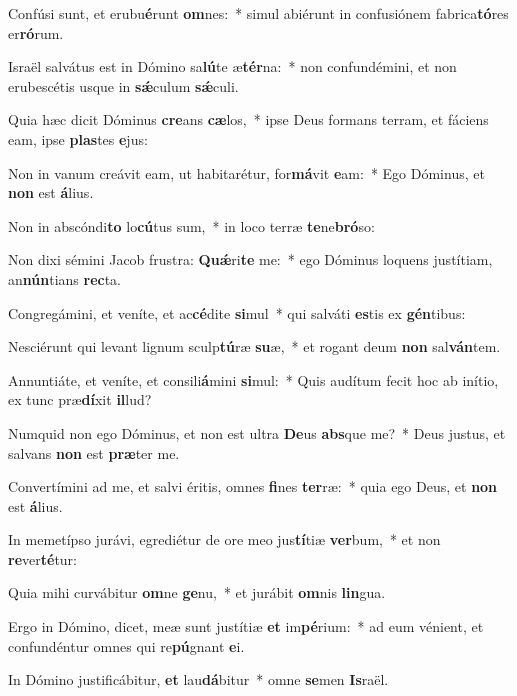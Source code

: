 \item Confúsi sunt, et erubu\textbf{é}runt \textbf{om}nes:~* simul abiérunt in confusiónem fabrica\textbf{tó}res er\textbf{ró}rum.
\item Israël salvátus est in Dómino sa\textbf{lú}te æ\textbf{tér}na:~* non confundémini, et non erubescétis usque in \textbf{sǽ}culum \textbf{sǽ}culi.
\item Quia hæc dicit Dóminus \textbf{cre}ans \textbf{cæ}los,~* ipse Deus formans terram, et fáciens eam, ipse \textbf{plas}tes \textbf{e}jus:
\item Non in vanum creávit eam, ut habitarétur, for\textbf{má}vit \textbf{e}am:~* Ego Dóminus, et \textbf{non} est \textbf{á}lius.
\item Non in abscóndi\textbf{to} lo\textbf{cú}tus sum,~* in loco terræ \textbf{te}ne\textbf{bró}so:
\item Non dixi sémini Jacob frustra: \textbf{Quǽ}ri\textbf{te} me:~* ego Dóminus loquens justítiam, an\textbf{nún}tians \textbf{rec}ta.
\item Congregámini, et veníte, et ac\textbf{cé}dite \textbf{si}mul~* qui salváti \textbf{es}tis ex \textbf{gén}tibus:
\item Nesciérunt qui levant lignum sculp\textbf{tú}ræ \textbf{su}æ,~* et rogant deum \textbf{non} sal\textbf{ván}tem.
\item Annuntiáte, et veníte, et consili\textbf{á}mini \textbf{si}mul:~* Quis audítum fecit hoc ab inítio, ex tunc præ\textbf{dí}xit \textbf{il}lud?
\item Numquid non ego Dóminus, et non est ultra \textbf{De}us \textbf{abs}que me?~* Deus justus, et salvans \textbf{non} est \textbf{præ}ter me.
\item Convertímini ad me, et salvi éritis, omnes \textbf{fi}nes \textbf{ter}ræ:~* quia ego Deus, et \textbf{non} est \textbf{á}lius.
\item In memetípso jurávi, egrediétur de ore meo jus\textbf{tí}tiæ \textbf{ver}bum,~* et non \textbf{re}ver\textbf{té}tur:
\item Quia mihi curvábitur \textbf{om}ne \textbf{ge}nu,~* et jurábit \textbf{om}nis \textbf{lin}gua.
\item Ergo in Dómino, dicet, meæ sunt justítiæ \textbf{et} im\textbf{pé}rium:~* ad eum vénient, et confundéntur omnes qui re\textbf{pú}gnant \textbf{e}i.
\item In Dómino justificábitur, \textbf{et} lau\textbf{dá}bitur~* omne \textbf{se}men \textbf{Is}raël.
